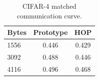 \begin{table}[t]
\centering
\caption{CIFAR-4 matched communication curve.}
\label{tab:comm-real}
\begin{tabular}{lcc}
\toprule
Bytes & Prototype & HOP \\
\midrule
1556 & 0.446 & 0.429 \\
3092 & 0.488 & 0.446 \\
4116 & 0.496 & 0.468 \\
\bottomrule
\end{tabular}
\end{table}
